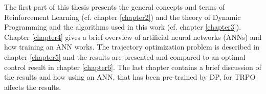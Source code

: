 The first part of this thesis presents the general concepts and terms of Reinforcement Learning (cf. chapter \ref{chapter2}) and the theory of Dynamic Programming and the algorithms used in this work (cf. chapter \ref{chapter3}). Chapter \ref{chapter4} gives a brief overview of artificial neural networks (ANNs) and how training an ANN works. The trajectory optimization problem is described in chapter \ref{chapter5} and the results are presented and compared to an optimal control result in chapter \ref{chapter6}. The last chapter contains a brief discussion of the results and how using an ANN, that has been pre-trained by DP, for TRPO affects the results.